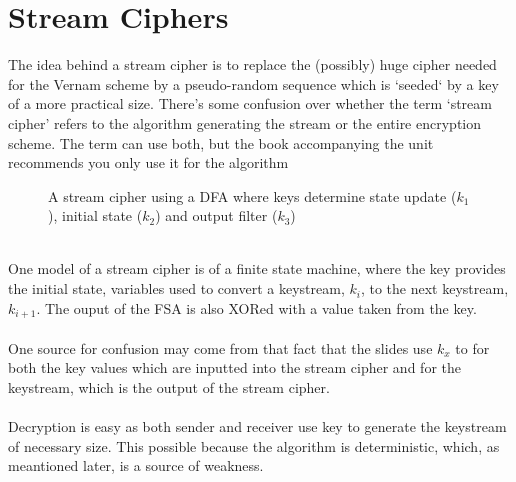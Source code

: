 \section{Stream Ciphers}
The idea behind a stream cipher is to replace the (possibly) huge cipher needed for the Vernam scheme by a pseudo-random sequence which is `seeded` by a key of a more practical size. There's some confusion over whether the term `stream cipher' refers to the algorithm generating the stream or the entire encryption scheme. The term can use both, but the book accompanying the unit recommends you only use it for the algorithm
\begin{figure}
    \caption{A stream cipher using a DFA where keys determine state update ($k_1$), initial state ($k_2$) and output filter ($k_3$)}
\end{figure}
\\
One model of a stream cipher is of a finite state machine, where the key provides the initial state, variables used to convert a keystream, $k_i$, to the next keystream, $k_{i+1}$. The ouput of the FSA is also XORed with a value taken from the key.\\
\\
One source for confusion may come from that fact that the slides use $k_x$ to for both the key values which are inputted into the stream cipher and for the keystream, which is the output of the stream cipher.\\
\\
Decryption is easy as both sender and receiver use key to generate the keystream of necessary size. This possible because the algorithm is deterministic, which, as meantioned later, is a source of weakness.
